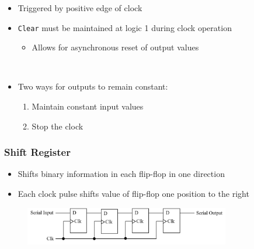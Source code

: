 \documentclass[a4paper]{article}
\begin{document}
\begin{minipage}[t]{0.6\textwidth}
\begin{itemize}
    \item Triggered by positive edge of clock
    \item \texttt{Clear} must be maintained at logic 1 during clock operation
    \begin{itemize}[label=$\circ$]
        \item Allows for asynchronous reset of output values
    \end{itemize}
    \mbox{}\\
    \item Two ways for outputs to remain constant:
    \begin{enumerate}
        \item Maintain constant input values
        \item Stop the clock
    \end{enumerate}
\end{itemize}
\end{minipage}

\subsubsection{Shift Register}
\begin{itemize}
    \item Shifts binary information in each flip-flop in one direction
    \item Each clock pulse shifts value of flip-flop one position to the right
\end{itemize}
\begin{figure}[H]
    \centering
    \includegraphics[width=0.8\textwidth]{serial-trf.png}
\end{figure}

\newpage
\end{document}
